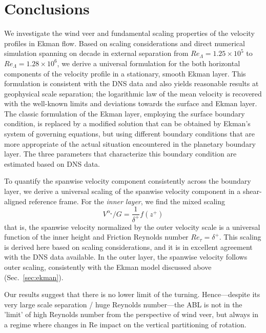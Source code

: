 \documentclass[smallcondensed,final]{svjour3}
\newcommand{\RE}{\mathrm{Re}}
\begin{document}
\section{Conclusions}
%
We investigate the wind veer and fundamental scaling properties of the velocity profiles in Ekman flow. 
%
Based on scaling considerations and direct numerical simulation spanning on decade in external separation from $Re_\Lambda=1.25 \times 10^5$ to $Re_\Lambda=1.28\times 10^6$, we derive a universal formulation for the both horizontal components of the velocity profile in a stationary, smooth Ekman layer.  
% 
This formulation is consistent with the DNS data and also yields reasonable results  at geophysical scale separation; the logarithmic law of the mean velocity is recovered with the well-known limits and deviations towards the surface and Ekman layer. 
%
The classic formulation of the Ekman layer, employing the surface boundary condition, is replaced by a modified solution that can be obtained by Ekman's system of governing equations, but using different boundary conditions that are more appropriate of the actual situation encountered in the planetary boundary layer. 
% 
The three parameters that characterize this boundary condition are estimated based on DNS data. 
% 
\par
% 
To quantify the spanwise velocity component consistently across the boundary layer, we derive a universal scaling of the spanwise velocity component in a shear-aligned reference frame. For the \emph{inner layer}, we find the mixed scaling  
%
\begin{equation} 
  V^{\alpha_\star}/G = \frac{1}{\delta^+} f(z^+)
\end{equation}
%
that is, the spanwise velocity normalized by the outer velocity scale is a universal function of the inner height and Friction Reynolds number $Re_\tau = \delta^+$. 
% 
This scaling is derived here based on scaling considerations, and it is in excellent agreement with the DNS data available.   
% 
In the outer layer, the spanwise velocity follows outer scaling, consistently with the Ekman model discussed above (Sec.~\ref{sec:ekman}).
% 
\par
% 
Our results suggest that there is no lower limit of the turning. 
% 
Hence---despite its very large scale separation / huge Reynolds number---the ABL is not 
in the 'limit' of high Reynolds number from the perspective of wind veer, but always in a regime where 
changes in $\RE$ impact on the vertical partitioning of rotation. 
\end{document}
